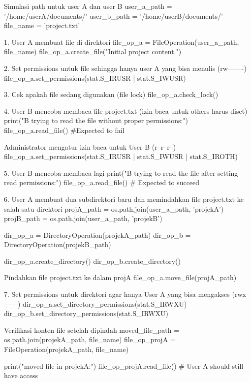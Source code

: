 \documentclass[12pt]{article}
\begin{document}
\begin{python}
Simulasi path untuk user A dan user B
    user_a_path = '/home/userA/documents/'
    user_b_path = '/home/userB/documents/'
    file_name = 'project.txt'
    
    1. User A membuat file di direktori
    file_op_a = FileOperation(user_a_path, file_name)
    file_op_a.create_file("Initial project content.\n")
    
    2. Set permissions untuk file sehingga hanya user A yang bisa menulis (rw-------)
    file_op_a.set_permissions(stat.S_IRUSR | stat.S_IWUSR)
    
    3. Cek apakah file sedang digunakan (file lock)
    file_op_a.check_lock()
    
    4. User B mencoba membaca file project.txt (izin baca untuk others harus diset)
    print("\nUser B trying to read the file without proper permissions:")
    file_op_a.read_file()  #Expected to fail
    
    Administrator mengatur izin baca untuk User B (r--r--r--)
    file_op_a.set_permissions(stat.S_IRUSR | stat.S_IWUSR | stat.S_IROTH)
    
    5. User B mencoba membaca lagi
    print("\nUser B trying to read the file after setting read permissions:")
    file_op_a.read_file()  # Expected to succeed
    
    6. User A membuat dua subdirektori baru dan memindahkan file project.txt ke salah satu direktori
    projA_path = os.path.join(user_a_path, 'projekA')
    projB_path = os.path.join(user_a_path, 'projekB')
    
    dir_op_a = DirectoryOperation(projekA_path)
    dir_op_b = DirectoryOperation(projekB_path)
    
    dir_op_a.create_directory()
    dir_op_b.create_directory()
    
    Pindahkan file project.txt ke dalam projA
    file_op_a.move_file(projA_path)
    
    7. Set permissions untuk direktori agar hanya User A yang bisa mengakses (rwx------)
    dir_op_a.set_directory_permissions(stat.S_IRWXU)
    dir_op_b.set_directory_permissions(stat.S_IRWXU)
    
    Verifikasi konten file setelah dipindah
    moved_file_path = os.path.join(projekA_path, file_name)
    file_op_projA = FileOperation(projekA_path, file_name)
    
    print("\nVerifying moved file in projekA:")
    file_op_projA.read_file() # User A should still have access

\end{python}
\end{document}
